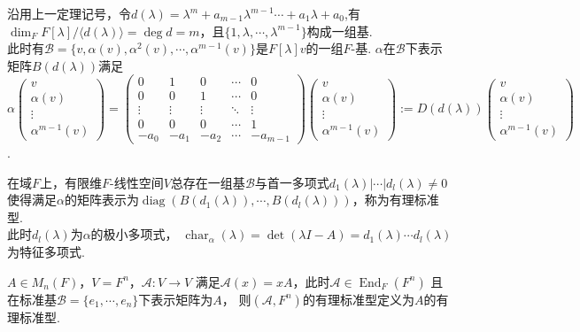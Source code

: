    \begin{proposition}
        沿用上一定理记号，令$d(\lambda)=\lambda^m+a_{m-1}\lambda^{m-1}\cdots+a_1\lambda+a_0$,有$\operatorname{dim}_F F[\lambda]/\langle d(\lambda)\rangle=\operatorname{deg} d=m$，且$\{1,\lambda,\cdots,\lambda^{m-1}\}$构成一组基.\\
        此时有$\mathscr{B}=\{v,\alpha(v),\alpha^2(v),\cdots,\alpha^{m-1}(v)\}$是$F[\lambda]v$的一组$F$-基. $\alpha$在$\mathscr{B}$下表示矩阵$B(d(\lambda))$满足\\
        $\alpha \begin{pmatrix}v\\\alpha(v)\\\vdots\\\alpha^{m-1}(v)\end{pmatrix}=\begin{pmatrix}0&1&0&\cdots&0\\0&0&1&\cdots&0\\\vdots&\vdots&\vdots&\ddots&\vdots\\0&0&0&\cdots&1\\-a_0&-a_1&-a_2&\cdots&-a_{m-1}\end{pmatrix}\begin{pmatrix}v\\\alpha(v)\\\vdots\\\alpha^{m-1}(v)\end{pmatrix}:=D(d(\lambda))\begin{pmatrix}v\\\alpha(v)\\\vdots\\\alpha^{m-1}(v)\end{pmatrix}$.\\
    \end{proposition}
    \begin{theorem}
        在域$F$上，有限维$F$-线性空间$V$总存在一组基$\mathscr{B}$与首一多项式$d_1(\lambda)|\cdots|d_l(\lambda)\neq 0$使得满足$\alpha$的矩阵表示为$\operatorname{diag}(B(d_1(\lambda)),\cdots,B(d_l(\lambda)))$，称为有理标准型.\\
        此时$d_l(\lambda)$为$\alpha$的极小多项式，
        $\operatorname{char}_{\alpha}(\lambda)=\operatorname{det}(\lambda I-A)
        =d_1(\lambda)\cdots d_l(\lambda)$为特征多项式.
    \end{theorem}
    \begin{definition}
        $A \in M_n(F)$，$V=F^n$，$\mathscr{A}:V\rightarrow V$
        满足$\mathscr{A}(x)=xA$，此时$\mathscr{A}\in\operatorname{End}_F(F^n)$
        且在标准基$\mathscr{B}=\{e_1,\cdots,e_n\}$下表示矩阵为$A$，
        则$(\mathscr{A},F^n)$的有理标准型定义为$A$的有理标准型.
    \end{definition}
